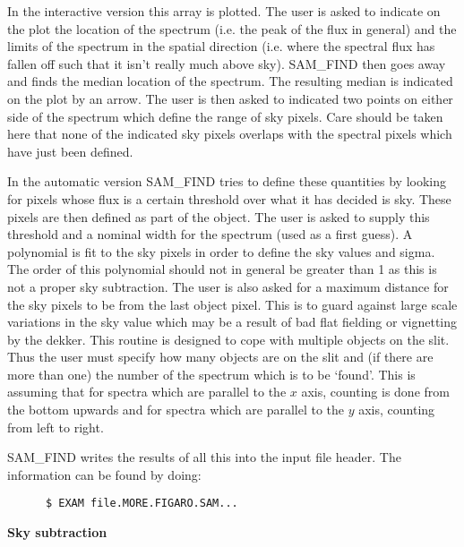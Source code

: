 In the interactive version this array is plotted.  The user is asked to 
indicate on the plot the location of the spectrum (i.e. the peak of the  flux
in general) and the limits of the spectrum in the spatial direction  (i.e.
where the spectral flux has fallen off such that it isn't really much above
sky).  SAM\_FIND then goes away and finds the median location of the 
spectrum.  The resulting median is indicated on the plot by an arrow. The user
is then asked to indicated two points on either side of the spectrum which
define the range of sky pixels.  Care should be taken here that  none of the
indicated sky pixels overlaps with the spectral pixels which have  just been
defined.

In the automatic version SAM\_FIND tries to define these quantities by 
looking for pixels whose flux is a certain threshold over what it has decided
is sky.  These pixels are then defined as part of the object.  The user is 
asked to supply this threshold and a nominal width for the spectrum (used as a
first guess). A polynomial is fit to the sky pixels in order to define the sky
values and sigma. The order of this polynomial should  not in general be
greater than 1 as this is not a proper sky subtraction. The user is also asked
for a maximum distance for the sky pixels to be from the last object pixel. 
This is to guard against large scale variations in  the sky value which may be
a result of bad flat fielding or vignetting by  the dekker.  This routine is
designed to cope with multiple  objects on the slit.  Thus the user must
specify how many objects are on the slit and (if there are more than one) the
number of the spectrum which  is to be `found'.  This is assuming that for
spectra which are parallel to the $x$ axis, counting is done from the bottom
upwards and for spectra which are parallel to the $y$ axis, counting from left
to right.

SAM\_FIND writes the results of all this into the input file header.  The 
information can be found by doing:

\begin{verbatim}
      $ EXAM file.MORE.FIGARO.SAM...
\end{verbatim}

{\bf Sky subtraction}


